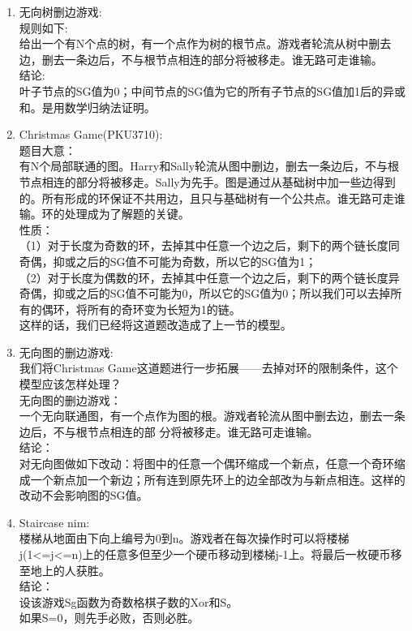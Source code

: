 \documentclass[landscape, twocolumn, 8pt, a4paper, twoside]{extarticle}
\begin{document}
\begin{enumerate}
	\item 无向树删边游戏:\\
		规则如下:\\
		给出一个有N个点的树，有一个点作为树的根节点。游戏者轮流从树中删去边，删去一条边后，不与根节点相连的部分将被移走。谁无路可走谁输。\\
		结论:\\
		叶子节点的SG值为0；中间节点的SG值为它的所有子节点的SG值加1后的异或和。是用数学归纳法证明。\\
	\item Christmas Game(PKU3710):\\
		题目大意：\\
		有N个局部联通的图。Harry和Sally轮流从图中删边，删去一条边后，不与根节点相连的部分将被移走。Sally为先手。图是通过从基础树中加一些边得到的。所有形成的环保证不共用边，且只与基础树有一个公共点。谁无路可走谁输。环的处理成为了解题的关键。\\
		性质：\\
		（1）对于长度为奇数的环，去掉其中任意一个边之后，剩下的两个链长度同奇偶，抑或之后的SG值不可能为奇数，所以它的SG值为1；\\
		（2）对于长度为偶数的环，去掉其中任意一个边之后，剩下的两个链长度异奇偶，抑或之后的SG值不可能为0，所以它的SG值为0；所以我们可以去掉所有的偶环，将所有的奇环变为长短为1的链。\\
		这样的话，我们已经将这道题改造成了上一节的模型。\\
	\item 无向图的删边游戏:\\
		我们将Christmas Game这道题进行一步拓展——去掉对环的限制条件，这个模型应该怎样处理？\\
		无向图的删边游戏：\\
		一个无向联通图，有一个点作为图的根。游戏者轮流从图中删去边，删去一条边后，不与根节点相连的部 分将被移走。谁无路可走谁输。 \\
		结论：\\
		对无向图做如下改动：将图中的任意一个偶环缩成一个新点，任意一个奇环缩成一个新点加一个新边；所有连到原先环上的边全部改为与新点相连。这样的改动不会影响图的SG值。\\
	\item Staircase nim:\\
		楼梯从地面由下向上编号为0到n。游戏者在每次操作时可以将楼梯j(1<=j<=n)上的任意多但至少一个硬币移动到楼梯j-1上。将最后一枚硬币移至地上的人获胜。\\
		结论：\\
		设该游戏Sg函数为奇数格棋子数的Xor和S。\\
		如果S=0，则先手必败，否则必胜。\\
\end{enumerate}
\end{document}

